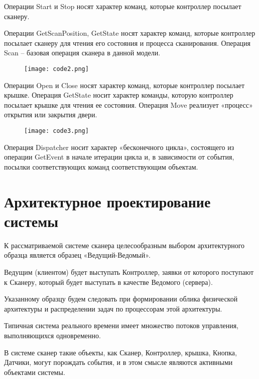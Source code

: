 \documentclass[12pt]{article}
\let\oldsection\section
\renewcommand{\section}[1]{
    \oldsection{#1}
    \setcounter{table}{0}
    \setcounter{figure}{0}
}
\begin{document}
    Операции Start и Stop носят характер команд, которые контроллер посылает сканеру.

    Операции GetScanPosition, GetState носят характер команд, которые контроллер посылает сканеру для чтения его состояния и процесса сканирования.
    Операция Scan – базовая операция сканера в данной модели.

    \begin{figure}[h]
        \texttt{[image: code2.png]}
    \end{figure}

    Операции Open и Close носят характер команд, которые контроллер посылает крышке.
    Операция GetState носит характер команды, которую контроллер посылает крышке для чтения ее состояния.
    Операция Move реализует «процесс» открытия или закрытия двери.

    \newpage

    \begin{figure}[h]
        \texttt{[image: code3.png]}
    \end{figure}

    Операция Dispatcher носит характер «бесконечного цикла», состоящего из операции GetEvent в начале итерации цикла и, в зависимости от события, посылки соответствующих команд соответствующим объектам.

    \newpage

    \section{Архитектурное проектирование системы}

    К рассматриваемой системе сканера целесообразным
    выбором архитектурного образца является образец «Ведущий-Ведомый».

    Ведущим (клиентом) будет выступать Контроллер, заявки от которого
    поступают к Сканеру, который будет выступать в качестве Ведомого (сервера).

    Указанному образцу будем следовать при формировании облика
    физической архитектуры и распределении задач по процессорам этой
    архитектуры.

    Типичная система реального времени имеет множество потоков
    управления, выполняющихся одновременно.

    В системе сканер такие объекты, как Сканер, Контроллер, крышка, Кнопка,
    Датчики, могут порождать события, и в этом смысле являются активными
    объектами системы.
\end{document}
